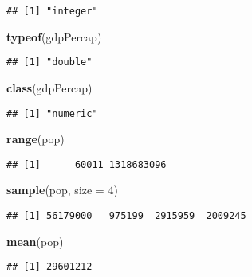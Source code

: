 \documentclass[]{article}
\newenvironment{Shaded}{\begin{snugshade}}{\end{snugshade}}
\newcommand{\DataTypeTok}[1]{\textcolor[rgb]{0.13,0.29,0.53}{#1}}
\newcommand{\DecValTok}[1]{\textcolor[rgb]{0.00,0.00,0.81}{#1}}
\newcommand{\KeywordTok}[1]{\textcolor[rgb]{0.13,0.29,0.53}{\textbf{#1}}}
\newcommand{\NormalTok}[1]{#1}
\begin{document}
\begin{verbatim}
## [1] "integer"
\end{verbatim}

\begin{Shaded}
\begin{Highlighting}[]
\KeywordTok{typeof}\NormalTok{(gdpPercap)}
\end{Highlighting}
\end{Shaded}

\begin{verbatim}
## [1] "double"
\end{verbatim}

\begin{Shaded}
\begin{Highlighting}[]
\KeywordTok{class}\NormalTok{(gdpPercap)}
\end{Highlighting}
\end{Shaded}

\begin{verbatim}
## [1] "numeric"
\end{verbatim}

\begin{Shaded}
\begin{Highlighting}[]
\KeywordTok{range}\NormalTok{(pop)}
\end{Highlighting}
\end{Shaded}

\begin{verbatim}
## [1]      60011 1318683096
\end{verbatim}

\begin{Shaded}
\begin{Highlighting}[]
\KeywordTok{sample}\NormalTok{(pop, }\DataTypeTok{size =} \DecValTok{4}\NormalTok{)}
\end{Highlighting}
\end{Shaded}

\begin{verbatim}
## [1] 56179000   975199  2915959  2009245
\end{verbatim}

\begin{Shaded}
\begin{Highlighting}[]
\KeywordTok{mean}\NormalTok{(pop)}
\end{Highlighting}
\end{Shaded}

\begin{verbatim}
## [1] 29601212
\end{verbatim}
\end{document}
